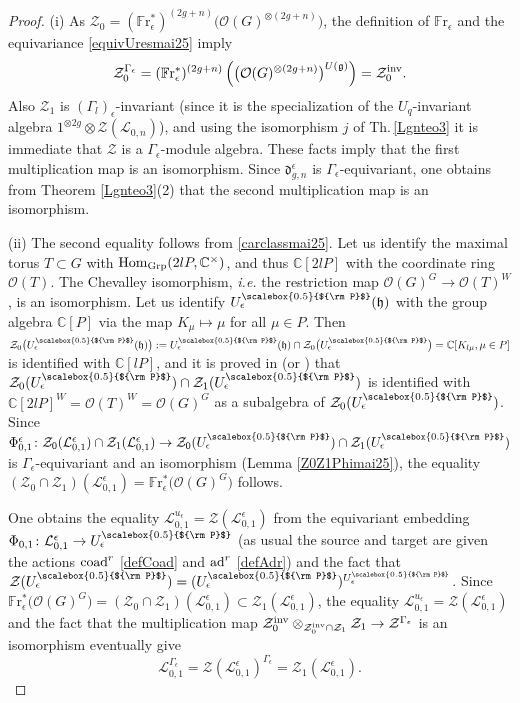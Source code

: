 \documentclass[11pt]{amsart}
\newcommand{\e}{\epsilon}
\newcommand{\mc}{\mathbb{C}}
\newcommand{\Ll}{\mathcal{L}}
\newcommand{\Oo}{\mathcal{O}}
\newcommand{\Pup}{{\scalebox{0.5}{${\rm P}$}}}
\begin{document}
\begin{proof} (i) As $\mathcal{Z}_0 = (\mathbb{F}\mathrm{r}_{\epsilon}^*)^{(2g+n)}\bigl(\mathcal{O}(G)^{\otimes (2g+n)}\bigr)$, the definition of $\mathbb{F}\mathrm{r}_\e$ and the equivariance \eqref{equivUresmai25} imply
$$\mathcal{Z}_0^{\Gamma_\e} = (\mathbb{F}\mathrm{r}_{\epsilon}^*)^{(2g+n)}\left(\bigl( \mathcal{O}(G)^{\otimes (2g+n)} \bigr)^{U(\mathfrak{g})} \right) = \mathcal{Z}_0^{\rm inv}.$$
Also $\mathcal{Z}_1$ is $(\Gamma_l)_\e$-invariant (since it is the specialization of the $U_q$-invariant algebra $1^{\otimes 2g} \otimes \mathcal{Z}(\Ll_{0,n})$), and using the isomorphism $j$ of Th.\,\ref{Lgnteo3} it is immediate that $\mathcal{Z}$ is a $\Gamma_\e$-module algebra. These facts imply that the first multiplication map is an isomorphism. Since $\mathfrak{d}_{g,n}^\e$ is $\Gamma_\e$-equivariant, one obtains from Theorem \ref{Lgnteo3}(2) that the second multiplication map is an isomorphism.

(ii) The second equality follows from \eqref{carclassmai25}. Let us identify the maximal torus $T\subset G$ with ${\rm Hom}_{\rm Grp}(2lP,\mc^\times)$, and thus $\mc[2lP]$ with the coordinate ring $\Oo(T)$. The Chevalley isomorphism, \textit{i.e.} the restriction map $\mathcal{O}(G)^{G}\to \Oo(T)^W$, is an isomorphism. Let us identify $U_\e^\Pup(\mathfrak{h})$ with the group algebra $\mc[P]$ via the map $K_\mu\mapsto \mu$ for all $\mu\in P$. Then $\mathcal{Z}_0\bigl( U_\e^\Pup(\mathfrak{h}) \bigr) := U_\e^\Pup(\mathfrak{h}) \cap \mathcal{Z}_0\bigl( U_\e^\Pup\bigr) = \mc[K_{l\mu}, \mu\in P]$ is identified with $\mc[lP]$, and it is proved in \cite[Prop.\,6.3]{DC-K-P1} (or \cite[\S 21.2]{DCP}) that $\mathcal{Z}_0 (U_\e^\Pup) \cap\mathcal{Z}_1(U_\e^\Pup)$ is identified with $\mc[2lP]^W = \Oo(T)^W = \mathcal{O}(G)^{G}$ as a subalgebra of $\mathcal{Z}_0(U_\e^\Pup)$. Since $\Phi_{0,1}^\e\colon \mathcal{Z}_0(\mathcal{L}_{0,1}^\e) \cap\mathcal{Z}_1 (\mathcal{L}_{0,1}^\e) \to \mathcal{Z}_0 (U_\e^\Pup) \cap\mathcal{Z}_1(U_\e^\Pup)$ is $\Gamma_\e$-equivariant and an isomorphism (Lemma \ref{Z0Z1Phimai25}), the equality $(\mathcal{Z}_0 \cap\mathcal{Z}_1) (\mathcal{L}_{0,1}^\e)= \mathbb{F}\mathrm{r}_{\epsilon}^*\bigl(\mathcal{O}(G)^{G}\bigr)$ follows.

One obtains the equality $\mathcal{L}_{0,1}^{u_\epsilon} = \mathcal{Z}(\mathcal{L}_{0,1}^{\e})$ from the equivariant embedding $\Phi_{0,1}\colon \mathcal{L}_{0,1}^\e \to U_\e^\Pup$ (as usual the source and target are given the actions ${\rm coad}^r$ \eqref{defCoad} and ${\rm ad}^r$ \eqref{defAdr}) and the fact that $\mathcal{Z}(U_\e^\Pup) = (U_\e^\Pup)^{U_\e^\Pup}$. Since $\mathbb{F}\mathrm{r}_{\epsilon}^*\bigl(\mathcal{O}(G)^{G}\bigr) = (\mathcal{Z}_0 \cap\mathcal{Z}_1) (\mathcal{L}_{0,1}^\e)\subset \mathcal{Z}_1 (\mathcal{L}_{0,1}^\e)$, the equality $\mathcal{L}_{0,1}^{u_\epsilon} = \mathcal{Z}(\mathcal{L}_{0,1}^{\e})$ and the fact that the multiplication map $\mathcal{Z}_0^{\rm inv}  \otimes_{\mathcal{Z}_0^{\rm inv} \cap \mathcal{Z}_1}  \mathcal{Z}_1 \to \mathcal{Z}^{\Gamma_\e}$ is an isomorphism eventually give $$\mathcal{L}_{0,1}^{\Gamma_\epsilon}  = \mathcal{Z}(\mathcal{L}_{0,1}^\e)^{\Gamma_\e} = \mathcal{Z}_1(\mathcal{L}_{0,1}^{\e}).$$


\end{proof}
\end{document}
